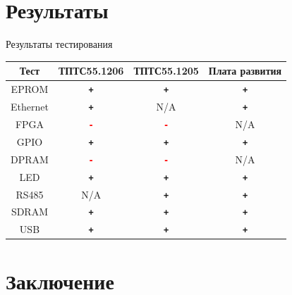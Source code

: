\documentclass[unicode, notheorems]{beamer}
\begin{document}
\section{Результаты}
\begin{frame}{Результаты тестирования}
\begin{center}
\begin{tabular}{|c|c|c|c|}
\hline Тест & ТПТС55.1206 & ТПТС55.1205 & Плата развития \\\hline
EPROM & \textcolor[rgb]{0,0.5,0}{\textbf{\texttt{+}}} &\textcolor[rgb]{0,0.5,0}{\textbf{\texttt{+}}}&\textcolor[rgb]{0,0.5,0}{\textbf{\texttt{+}}}\\\hline
Ethernet &\textcolor[rgb]{0,0.5,0}{\textbf{\texttt{+}}}& N/A &\textcolor[rgb]{0,0.5,0}{\textbf{\texttt{+}}}\\\hline
FPGA & \textcolor{red}{\textbf{\texttt{-}}} & \textcolor{red}{\textbf{\texttt{-}}} & N/A \\\hline
GPIO &\textcolor[rgb]{0,0.5,0}{\textbf{\texttt{+}}}&\textcolor[rgb]{0,0.5,0}{\textbf{\texttt{+}}}&\textcolor[rgb]{0,0.5,0}{\textbf{\texttt{+}}}\\\hline
DPRAM & \textcolor{red}{\textbf{\texttt{-}}} & \textcolor{red}{\textbf{\texttt{-}}} & N/A \\\hline
LED &\textcolor[rgb]{0,0.5,0}{\textbf{\texttt{+}}}&\textcolor[rgb]{0,0.5,0}{\textbf{\texttt{+}}}&\textcolor[rgb]{0,0.5,0}{\textbf{\texttt{+}}}\\\hline
RS485 & N/A &\textcolor[rgb]{0,0.5,0}{\textbf{\texttt{+}}}&\textcolor[rgb]{0,0.5,0}{\textbf{\texttt{+}}}\\\hline
SDRAM &\textcolor[rgb]{0,0.5,0}{\textbf{\texttt{+}}}&\textcolor[rgb]{0,0.5,0}{\textbf{\texttt{+}}}&\textcolor[rgb]{0,0.5,0}{\textbf{\texttt{+}}}\\\hline
USB &\textcolor[rgb]{0,0.5,0}{\textbf{\texttt{+}}}&\textcolor[rgb]{0,0.5,0}{\textbf{\texttt{+}}}&\textcolor[rgb]{0,0.5,0}{\textbf{\texttt{+}}}\\\hline
\end{tabular}
\end{center}
\end{frame}


\section{Заключение}
\end{document}
